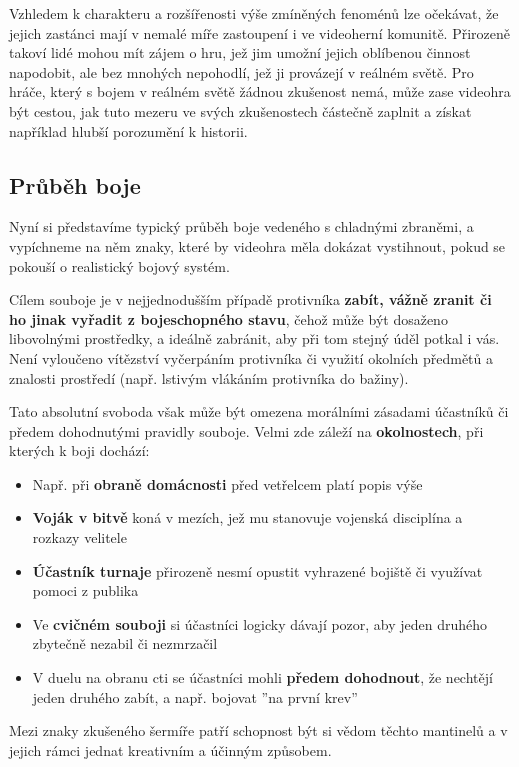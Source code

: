 Vzhledem k charakteru a rozšířenosti výše zmíněných fenoménů lze očekávat, že jejich zastánci mají v nemalé míře zastoupení i ve videoherní komunitě. Přirozeně takoví lidé mohou mít zájem o hru, jež jim umožní jejich oblíbenou činnost napodobit, ale bez mnohých nepohodlí, jež ji provázejí v reálném světě. Pro hráče, který s bojem v reálném světě žádnou zkušenost nemá, může zase videohra být cestou, jak tuto mezeru ve svých zkušenostech částečně zaplnit a získat například hlubší porozumění k historii.

\subsection{Průběh boje}
Nyní si představíme typický průběh boje vedeného s chladnými zbraněmi, a vypíchneme na něm znaky, které by videohra měla dokázat vystihnout, pokud se pokouší o realistický bojový systém.
\bigbreak

Cílem souboje je v nejjednodušším případě protivníka \textbf{zabít, vážně zranit či ho jinak vyřadit z bojeschopného stavu}, čehož může být dosaženo libovolnými prostředky, a ideálně zabránit, aby při tom stejný úděl potkal i vás. Není vyloučeno vítězství vyčerpáním protivníka či využití okolních předmětů a znalosti prostředí (např. lstivým vlákáním protivníka do bažiny).

Tato absolutní svoboda však může být omezena morálními zásadami účastníků\cite{HistoryOfSurrender} či předem dohodnutými pravidly souboje. Velmi zde záleží na \textbf{okolnostech}, při kterých k boji dochází:
\begin{itemize}
    \item Např. při \textbf{obraně domácnosti} před vetřelcem platí popis výše
    \item \textbf{Voják v bitvě} koná v mezích, jež mu stanovuje vojenská disciplína a rozkazy velitele
    \item \textbf{Účastník turnaje} přirozeně nesmí opustit vyhrazené bojiště či využívat pomoci z publika
    \item Ve \textbf{cvičném souboji} si účastníci logicky dávají pozor, aby jeden druhého zbytečně nezabil či nezmrzačil
    \item V duelu na obranu cti se účastníci mohli \textbf{předem dohodnout}, že nechtějí jeden druhého zabít, a např. bojovat ''na první krev''
\end{itemize}
Mezi znaky zkušeného šermíře patří schopnost být si vědom těchto mantinelů a v jejich rámci jednat kreativním a účinným způsobem.

